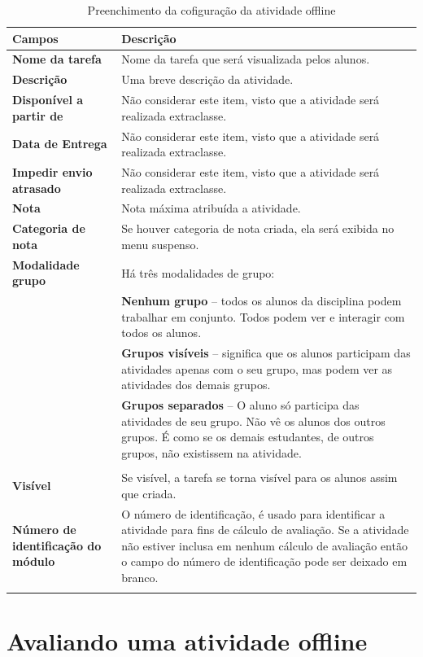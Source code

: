 \begin{longtable}{p{6cm}|p{9cm}}
     \hline
     \rowcolor[rgb]{0.8,0.8,0.8} \textbf{Campos} &  \textbf{Descrição}\\\hline
    \textbf{Nome da tarefa} & Nome da tarefa que será visualizada pelos alunos. \\\hline
    \textbf{Descrição} &Uma breve descrição da atividade. \\\hline
    \textbf{Disponível a partir de} &Não considerar este item, visto que a atividade será realizada extraclasse.\\\hline
    \textbf{Data de Entrega} &Não considerar este item, visto que a atividade será realizada extraclasse. \\\hline
    \textbf{Impedir envio atrasado} & Não considerar este item, visto que a atividade será realizada extraclasse. \\\hline
    \textbf{Nota} & Nota máxima atribuída a atividade.\\\hline
    \textbf{Categoria de nota} & Se houver categoria de nota criada, ela será exibida no menu suspenso.\\\hline
    \textbf{Modalidade grupo} & Há três modalidades de grupo:\\
& \textbf{Nenhum grupo} – todos os alunos da disciplina podem trabalhar em conjunto. Todos podem ver e interagir com todos os  alunos. \\
& \textbf{Grupos visíveis} – significa que os alunos participam das atividades apenas com o seu grupo, mas podem ver as atividades dos demais grupos.\\
& \textbf{Grupos separados} – O aluno só participa das atividades de seu grupo. Não vê os alunos dos outros grupos. É como se os demais estudantes, de outros grupos, não existissem na atividade.\\
\\\hline
    \textbf{Visível} &Se visível, a tarefa se torna visível para os alunos assim que criada.\\\hline
    \textbf{Número de identificação do módulo} & O número de identificação,  é usado para identificar a atividade para fins de cálculo de avaliação. Se a atividade não estiver inclusa em nenhum cálculo de avaliação então o campo do número de identificação pode ser deixado em branco. \\\hline
\caption{Preenchimento da cofiguração da atividade offline}
\end{longtable}%

\section{Avaliando uma atividade offline}


